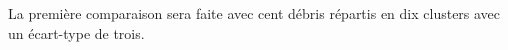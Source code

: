 La première comparaison sera faite avec cent débris répartis en dix clusters
avec un écart-type de trois.